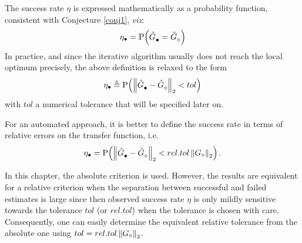 The success rate $\eta$ is expressed mathematically as a probability function, consistent with Conjecture \ref{conj1}, \emph{viz}:
\begin{equation}
\eta_{\bullet}=\Prob{\model{\bullet}=\model{\trueSymbol}}
\end{equation}
In practice, and since the iterative algorithm usually does not reach the local optimum precisely, the above definition is relaxed to the form
\begin{equation}\label{eq:successrateTol}
\eta_{\bullet} \isdef \Prob{ \norm[2]{\model{\bullet} - \model{\trueSymbol}} < tol}
\end{equation}
with $tol$ a numerical tolerance that will be specified later on.
\begin{remark}
For an automated approach, it is better to define the success rate in terms of relative errors on the transfer function, i.e.
\begin{equation}
\eta_{\bullet} = \Prob{ \norm[2]{\model{\bullet}-\model{\trueSymbol}} < rel.tol  \norm[2]{\true{G}}}
\text{.}
\end{equation}
\end{remark}
\begin{remark}
In this chapter, the absolute criterion is used.
However, the results are equivalent for a relative criterion when the separation between successful and failed estimates is large since then observed success rate $\eta$ is only mildly sensitive towards the tolerance $tol$ (or $rel.tol$) when the tolerance is chosen with care.
Consequently, one can easily determine the equivalent relative tolerance from the absolute one using $tol = rel.tol \norm[2]{\true{G}}$.
\end{remark}



